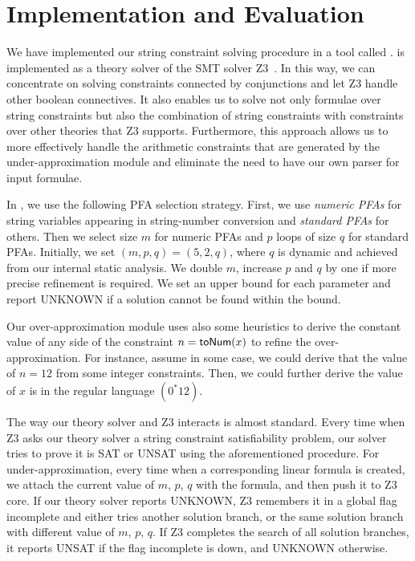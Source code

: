 \section{Implementation and Evaluation}
\label{section:evaluation}

We have implemented our string constraint solving procedure in a tool called {\tool}. {\tool} is implemented as a theory solver of the SMT solver Z3~\cite{z3}. In this way, we can concentrate on solving constraints connected by conjunctions and let Z3 handle other boolean connectives. It also enables us to solve not only formulae over string constraints but also the combination of string constraints with constraints over other theories that Z3 supports. Furthermore, this approach allows us to more effectively handle the arithmetic constraints that are generated by the under-approximation module and eliminate the need to have our own parser for input formulae. 

In {\tool}, we use the following PFA selection strategy. First, we use \emph{numeric PFAs} for string variables appearing in string-number conversion and \emph{standard PFAs} for others. Then we select size $m$ for numeric PFAs and $p$ loops of size $q$ for standard PFAs. Initially, we set $(m,p,q)=(5,2,q)$, where $q$ is dynamic and achieved from our internal static analysis. We double $m$, increase $p$ and $q$ by one if more precise refinement is required. We set an upper bound for each parameter and report UNKNOWN if a solution cannot be found within the bound.

Our over-approximation module uses also some heuristics to derive the constant value of any side of the constraint $n=\mbox{\textsf{toNum}($x$)}$ to refine the over-approximation. For instance, assume in some case, we could derive that the value of $n=12$ from some integer constraints.  Then, we could further derive the value of $x$ is in the regular language $(0^*12)$. 

The way our theory solver and Z3 interacts is almost standard. Every time when Z3 asks our theory solver a string constraint satisfiability problem, our solver tries to prove it is SAT or UNSAT using the aforementioned procedure. For under-approximation, every time when a corresponding linear formula is created, we attach the current value of $m$, $p$, $q$ with the formula, and then push it to Z3 core. If our theory solver reports UNKNOWN, Z3 remembers it in a global flag \textsf{incomplete} and either tries another solution branch, or the same solution branch with different value of $m$, $p$, $q$. If Z3 completes the search of all solution branches, it reports UNSAT if the flag \textsf{incomplete} is down, and UNKNOWN otherwise.





